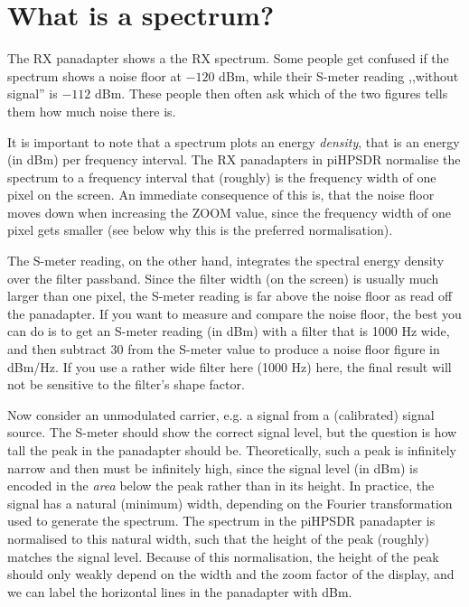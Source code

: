 \documentclass[12pt]{book}
\def\pH{pi\-HPSDR\xspace}
\begin{document}
\section{What is a spectrum?}
The RX panadapter shows a the RX spectrum.
Some people get confused if the spectrum shows a noise floor at $-120$ dBm, while their S-meter
reading ,,without signal'' is $-112$ dBm. These people then often ask which of the two figures tells
them how much noise there is.

It is important to note that a spectrum plots an energy \textit{density}, that is an energy (in dBm)
per frequency interval. The RX panadapters in \pH normalise the spectrum to a frequency interval
that (roughly) is the frequency width of one pixel on the screen. An immediate consequence of this is, that the
noise floor moves down when increasing the ZOOM value, since the frequency width of one pixel gets
smaller (see below why this is the preferred normalisation).

The S-meter reading, on the other hand, integrates the spectral energy density over the filter
passband. Since the filter width (on the screen) is usually much larger than one pixel,
the S-meter reading is far above the noise floor as read off the panadapter.
If you want to measure and compare the noise floor, the best you can do is to get an S-meter reading (in dBm) with
a filter that is 1000 Hz wide, and then subtract 30 from the S-meter value to
produce a noise floor figure in dBm/Hz. If you use a rather wide filter here (1000 Hz) here, the
final result will not be sensitive to the filter's shape factor.

Now consider an unmodulated carrier, e.g. a signal from a (calibrated)
signal source. The S-meter should show the correct signal level, but the question is how tall the peak
in the panadapter should be. Theoretically, such a peak is infinitely narrow and then must be infinitely high, since
the signal level (in dBm) is encoded in the \textit{area} below the peak rather than in its height.
In practice, the signal has a natural (minimum) width, depending on the 
Fourier transformation used to generate the spectrum. The spectrum in the \pH panadapter is normalised
to this natural width, such that the height of the peak (roughly) matches the signal level.
Because of this normalisation, the height of the peak should only weakly depend on the width and
the zoom factor of the display, and we can label the horizontal lines in the panadapter with dBm.
\end{document}
